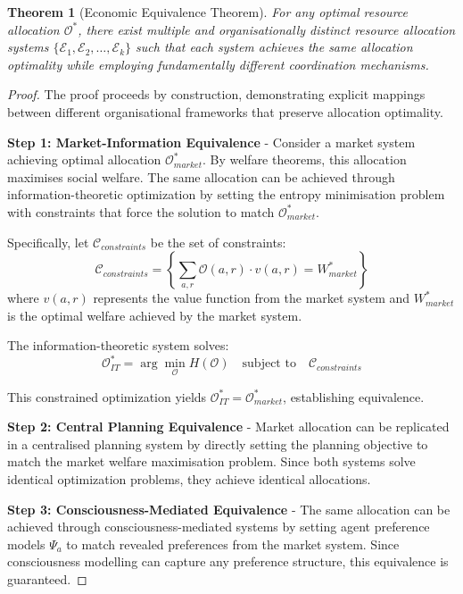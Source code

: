 \documentclass[12pt,a4paper]{article}
\newtheorem{theorem}{Theorem}
\begin{document}
\begin{theorem}[Economic Equivalence Theorem]
For any optimal resource allocation $\mathcal{O}^*$, there exist multiple and organisationally distinct resource allocation systems $\{\mathcal{E}_1, \mathcal{E}_2, \ldots, \mathcal{E}_k\}$ such that each system achieves the same allocation optimality while employing fundamentally different coordination mechanisms.
\end{theorem}

\begin{proof}
The proof proceeds by construction, demonstrating explicit mappings between different organisational frameworks that preserve allocation optimality.

\textbf{Step 1: Market-Information Equivalence} - Consider a market system achieving optimal allocation $\mathcal{O}^*_{market}$. By welfare theorems, this allocation maximises social welfare. The same allocation can be achieved through information-theoretic optimization by setting the entropy minimisation problem with constraints that force the solution to match $\mathcal{O}^*_{market}$.

Specifically, let $\mathcal{C}_{constraints}$ be the set of constraints:
\begin{equation}
\mathcal{C}_{constraints} = \left\{\sum_{a,r} \mathcal{O}(a,r) \cdot v(a,r) = W^*_{market}\right\}
\end{equation}
where $v(a,r)$ represents the value function from the market system and $W^*_{market}$ is the optimal welfare achieved by the market system.

The information-theoretic system solves:
\begin{equation}
\mathcal{O}^*_{IT} = \arg\min_{\mathcal{O}} H(\mathcal{O}) \quad \text{subject to} \quad \mathcal{C}_{constraints}
\end{equation}

This constrained optimization yields $\mathcal{O}^*_{IT} = \mathcal{O}^*_{market}$, establishing equivalence.

\textbf{Step 2: Central Planning Equivalence} - Market allocation can be replicated in a centralised planning system by directly setting the planning objective to match the market welfare maximisation problem. Since both systems solve identical optimization problems, they achieve identical allocations.

\textbf{Step 3: Consciousness-Mediated Equivalence} - The same allocation can be achieved through consciousness-mediated systems by setting agent preference models $\Psi_a$ to match revealed preferences from the market system. Since consciousness modelling can capture any preference structure, this equivalence is guaranteed.


\end{proof}
\end{document}
